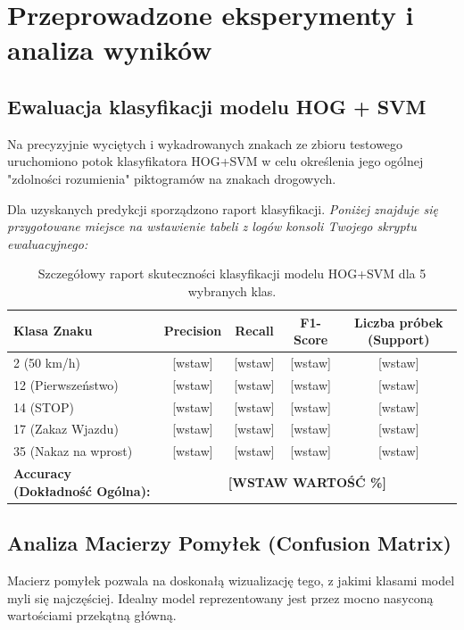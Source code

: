 \documentclass[12pt,a4paper]{article}
\begin{document}
\section{Przeprowadzone eksperymenty i analiza wyników}

\subsection{Ewaluacja klasyfikacji modelu HOG + SVM}
Na precyzyjnie wyciętych i wykadrowanych znakach ze zbioru testowego uruchomiono potok klasyfikatora HOG+SVM w celu określenia jego ogólnej "zdolności rozumienia" piktogramów na znakach drogowych. 

Dla uzyskanych predykcji sporządzono raport klasyfikacji.
\textit{Poniżej znajduje się przygotowane miejsce na wstawienie tabeli z logów konsoli Twojego skryptu ewaluacyjnego:}

\begin{table}[H]
    \centering
    \begin{tabular}{l c c c c}
        \toprule
        \textbf{Klasa Znaku} & \textbf{Precision} & \textbf{Recall} & \textbf{F1-Score} & \textbf{Liczba próbek (Support)} \\
        \midrule
        2 (50 km/h)          & [wstaw] & [wstaw] & [wstaw] & [wstaw] \\
        12 (Pierwszeństwo)   & [wstaw] & [wstaw] & [wstaw] & [wstaw] \\
        14 (STOP)            & [wstaw] & [wstaw] & [wstaw] & [wstaw] \\
        17 (Zakaz Wjazdu)    & [wstaw] & [wstaw] & [wstaw] & [wstaw] \\
        35 (Nakaz na wprost) & [wstaw] & [wstaw] & [wstaw] & [wstaw] \\
        \midrule
        \textbf{Accuracy (Dokładność Ogólna):} & \multicolumn{4}{c}{\textbf{[WSTAW WARTOŚĆ \%]}} \\
        \bottomrule
    \end{tabular}
    \caption{Szczegółowy raport skuteczności klasyfikacji modelu HOG+SVM dla 5 wybranych klas.}
\end{table}

\subsection{Analiza Macierzy Pomyłek (Confusion Matrix)}
Macierz pomyłek pozwala na doskonałą wizualizację tego, z jakimi klasami model myli się najczęściej. Idealny model reprezentowany jest przez mocno nasyconą wartościami przekątną główną.
\end{document}
